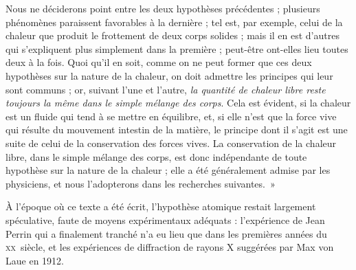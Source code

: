 	Nous ne déciderons point entre les deux hypothèses précédentes ; plusieurs phénomènes paraissent favorables à la dernière ; tel est, par exemple, celui de la chaleur que produit le frottement de deux corps solides ; mais il en est d’autres qui s’expliquent plus simplement dans la première ; peut-être ont-elles lieu toutes deux à la fois. Quoi qu’il en soit, comme on ne peut former que ces deux hypothèses sur la nature de la chaleur, on doit admettre les principes qui leur sont communs ; or, suivant l’une et l’autre, \emph{la quantité de chaleur libre reste toujours la même dans le simple mélange des corps}. Cela est évident, si la chaleur est un fluide qui tend à se mettre en équilibre, et, si elle n’est que la force vive qui résulte du mouvement intestin de la matière, le principe dont il s’agit est une suite de celui de la conservation des forces vives. La conservation de la chaleur libre, dans le simple mélange des corps, est donc indépendante de toute hypothèse sur la nature de la chaleur ; elle a été généralement admise par les physiciens, et nous l’adopterons dans les recherches suivantes.~» \onlyframabook{\end{quote}}

	À l'époque où ce texte a été écrit, l'hypothèse atomique restait largement spéculative, faute de moyens expérimentaux adéquats : l'expérience de Jean Perrin qui a finalement tranché n'a eu lieu que dans les premières années du \textsc{xx}\ieme\ siècle, et les expériences de diffraction de rayons X suggérées par Max von Laue en 1912.

\atendofhistorysection
